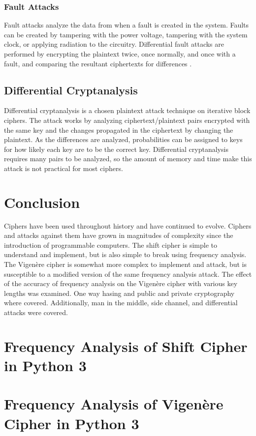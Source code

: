 \documentclass[12pt]{article}
\begin{document}
\subsubsection{Fault Attacks}
Fault attacks analyze the data from when a fault is created in the system. Faults can be created by tampering with the power voltage, tampering with the system clock, or applying radiation to the circuitry. Differential fault attacks are performed by encrypting the plaintext twice, once normally, and once with a fault, and comparing the resultant ciphertexts for differences \cite[pg. 7]{sidechannel}.

\subsection{Differential Cryptanalysis}
Differential cryptanalysis is a chosen plaintext attack technique on iterative block ciphers. The attack works by analyzing ciphertext/plaintext pairs encrypted with the same key and the changes propagated in the ciphertext by changing the plaintext. As the differences are analyzed, probabilities can be assigned to keys for how likely each key are to be the correct key. Differential cryptanalysis requires many pairs to be analyzed, so the amount of memory and time make this attack is not practical for most ciphers\cite[pg. 285-290]{appcrypt}.

\section{Conclusion}
Ciphers have been used throughout history and have continued to evolve. Ciphers  and attacks against them have grown in magnitudes of complexity since the introduction of programmable computers. The shift cipher is simple to understand and implement, but is also simple to break using frequency analysis. The Vigen\`{e}re cipher is somewhat more complex to implement and attack, but is susceptible to a modified version of the same frequency analysis attack. The effect of the accuracy of frequency analysis on the Vigen\`{e}re cipher with various key lengths was examined. One way hasing and public and private cryptography where covered. Additionally, man in the middle, side channel, and differential attacks were covered.

\newpage


\newpage
\appendix

\section{Frequency Analysis of Shift Cipher in Python 3}



\newpage
\section{Frequency Analysis of Vigen\`{e}re Cipher in Python 3}


\end{document}
